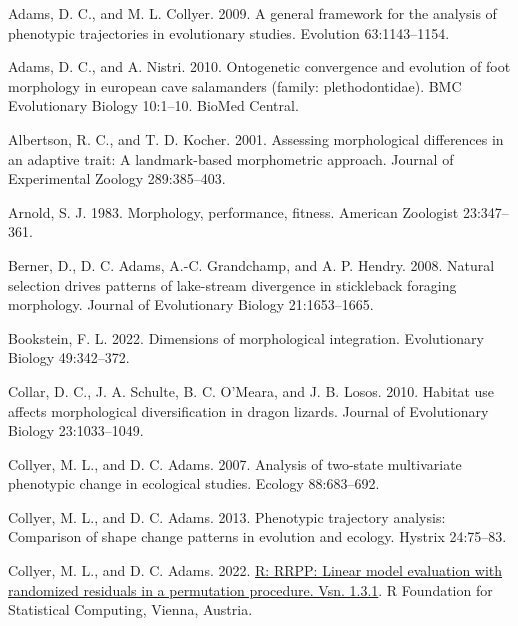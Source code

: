 \documentclass[
  11pt,
]{article}
\newlength{\cslhangindent}
\newlength{\cslentryspacingunit} %
\newenvironment{CSLReferences}[2] %
 {%
  \setlength{\parindent}{0pt}
  \ifodd #1
  \let\oldpar\par
  \def\par{\hangindent=\cslhangindent\oldpar}
  \fi
  \setlength{\parskip}{#2\cslentryspacingunit}
 }%
 {}
\begin{document}
\hypertarget{refs}{}
\begin{CSLReferences}{1}{0}
\leavevmode{}%
Adams, D. C., and M. L. Collyer. 2009. A general framework for the
analysis of phenotypic trajectories in evolutionary studies. Evolution
63:1143--1154.

\leavevmode{}%
Adams, D. C., and A. Nistri. 2010. Ontogenetic convergence and evolution
of foot morphology in european cave salamanders (family:
plethodontidae). BMC Evolutionary Biology 10:1--10. BioMed Central.

\leavevmode{}%
Albertson, R. C., and T. D. Kocher. 2001. Assessing morphological
differences in an adaptive trait: A landmark-based morphometric
approach. Journal of Experimental Zoology 289:385--403.

\leavevmode{}%
Arnold, S. J. 1983. Morphology, performance, fitness. American Zoologist
23:347--361.

\leavevmode{}%
Berner, D., D. C. Adams, A.-C. Grandchamp, and A. P. Hendry. 2008.
Natural selection drives patterns of lake-stream divergence in
stickleback foraging morphology. Journal of Evolutionary Biology
21:1653--1665.

\leavevmode{}%
Bookstein, F. L. 2022. Dimensions of morphological integration.
Evolutionary Biology 49:342--372.

\leavevmode{}%
Collar, D. C., J. A. Schulte, B. C. O'Meara, and J. B. Losos. 2010.
Habitat use affects morphological diversification in dragon lizards.
Journal of Evolutionary Biology 23:1033--1049.

\leavevmode{}%
Collyer, M. L., and D. C. Adams. 2007. Analysis of two-state
multivariate phenotypic change in ecological studies. Ecology
88:683--692.

\leavevmode{}%
Collyer, M. L., and D. C. Adams. 2013. Phenotypic trajectory analysis:
Comparison of shape change patterns in evolution and ecology. Hystrix
24:75--83.

\leavevmode{}%
Collyer, M. L., and D. C. Adams. 2022.
\href{https://CRAN.R-project.org/package=RRPP}{R: RRPP: Linear model
evaluation with randomized residuals in a permutation procedure. Vsn.
1.3.1}. R Foundation for Statistical Computing, Vienna, Austria.


\end{CSLReferences}
\end{document}
